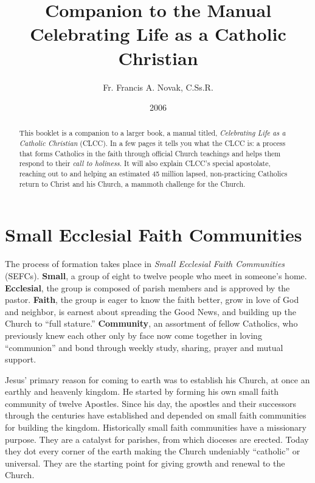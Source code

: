 \documentclass{article}
\title{\textbf{Companion to the Manual} \\
               Celebrating Life as a Catholic Christian}
\author{Fr. Francis A. Novak, C.Ss.R.}
\date{2006}
\begin{document}

\maketitle

\renewcommand{\abstractname}{\emph{\textmd{Veni, Sancte Spiritus!}}}
\begin{abstract}

This booklet is a companion to a larger book, a manual titled, \emph{Celebrating
Life as a Catholic Christian} (CLCC). In a few pages it tells you what the CLCC
is: a process that forms Catholics in the faith through official Church
teachings and helps them respond to their \emph{call to holiness}. It will also
explain CLCC's special apostolate, reaching out to and helping an estimated 45
million lapsed, non-practicing Catholics return to Christ and his Church, a
mammoth challenge for the Church.

\end{abstract}


\setcounter{secnumdepth}{0}
\section{Small Ecclesial Faith Communities}

The process of formation takes place in \emph{Small Ecclesial Faith Communities}
(SEFCs). \textbf{Small}, a group of eight to twelve people who meet in someone's
home. \textbf{Ecclesial}, the group is composed of parish members and is
approved by the pastor. \textbf{Faith}, the group is eager to know the faith
better, grow in love of God and neighbor, is earnest about spreading the Good
News, and building up the Church to ``full stature.'' \textbf{Community}, an
assortment of fellow Catholics, who previously knew each other only by face now
come together in loving ``communion'' and bond through weekly study, sharing,
prayer and mutual support.

Jesus' primary reason for coming to earth was to establish his Church, at once
an earthly and heavenly kingdom. He started by forming his own small faith
community of twelve Apostles. Since his day, the apostles and their successors
through the centuries have established and depended on small faith communities
for building the kingdom. Historically small faith communities have a missionary
purpose. They are a catalyst for parishes, from which dioceses are
erected. Today they dot every corner of the earth making the Church undeniably
``catholic'' or universal. They are the starting point for giving growth and
renewal to the Church.
\end{document}
